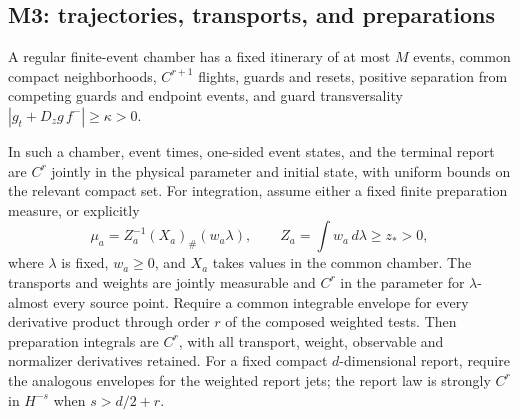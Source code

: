 \subsection{M3: trajectories, transports, and preparations}
A regular finite-event chamber has a fixed itinerary of at most $M$ events,
common compact neighborhoods, $C^{r+1}$ flights, guards and resets, positive
separation from competing guards and endpoint events, and guard
transversality $|g_t+D_zg\,f^-|\ge\kappa>0$.

\begin{theorem}\label{thm:transport-prep}
In such a chamber, event times, one-sided event states, and the terminal
report are $C^r$ jointly in the physical parameter and initial state, with
uniform bounds on the relevant compact set. For integration, assume either
a fixed finite preparation measure, or explicitly
\begin{equation}
 \mu_a=Z_a^{-1}(X_a)_\#(w_a\lambda),\qquad
 Z_a=\int w_a\,d\lambda\ge z_*>0,
 \label{eq:transport-prep}
\end{equation}
where $\lambda$ is fixed, $w_a\ge0$, and $X_a$ takes values in the common
chamber. The transports and weights are jointly measurable and $C^r$ in
the parameter for $\lambda$-almost every source point. Require a common
integrable envelope for every derivative product through order $r$ of the
composed weighted tests. Then preparation integrals are $C^r$, with all
transport, weight, observable and normalizer derivatives retained. For a
fixed compact $d$-dimensional report, require the analogous envelopes for
the weighted report jets; the report law is strongly $C^r$ in $H^{-s}$
when $s>d/2+r$.
\end{theorem}
